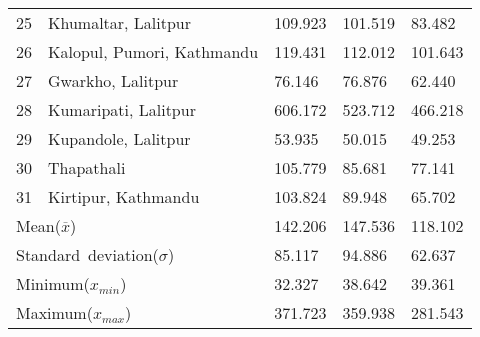\begin{tabularx}{\textwidth}{ | l | p{} | X | X | X | }
 25 & Khumaltar, Lalitpur  & 109.923 & 101.519 & 83.482 \\
 26 & Kalopul, Pumori, Kathmandu & 119.431 & 112.012 & 101.643 \\
 27 & Gwarkho, Lalitpur & 76.146 & 76.876 & 62.440 \\
 28 & Kumaripati, Lalitpur & 606.172 & 523.712 & 466.218 \\
 29 & Kupandole, Lalitpur & 53.935 & 50.015 & 49.253 \\
 30 & Thapathali & 105.779 & 85.681 & 77.141 \\
 31 & Kirtipur, Kathmandu & 103.824 & 89.948 & 65.702 \\
\hline
\multicolumn{2}{|X|}{\mbox{Mean($\overline{x}$)}} & 142.206 & 147.536 & 118.102 \\
\multicolumn{2}{|X|}{\mbox{Standard deviation($\sigma$)}} & 85.117 & 94.886 & 62.637 \\
\multicolumn{2}{|X|}{\mbox{Minimum($x_{min}$)}} & 32.327 & 38.642 & 39.361 \\
\multicolumn{2}{|X|}{\mbox{Maximum($x_{max}$)}} & 371.723 & 359.938 & 281.543 \\
\hline
\end{tabularx}
